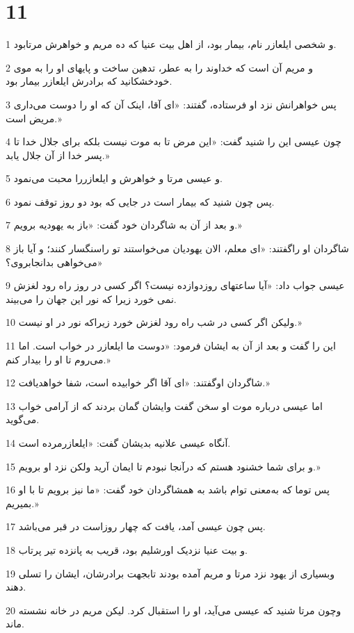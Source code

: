 \chapter{11}

\par 1 و شخصی ایلعازر نام، بیمار بود، از اهل بیت عنیا که ده مریم و خواهرش مرتابود.
\par 2 و مریم آن است که خداوند را به عطر، تدهین ساخت و پایهای او را به موی خودخشکانید که برادرش ایلعازر بیمار بود.
\par 3 پس خواهرانش نزد او فرستاده، گفتند: «ای آقا، اینک آن که او را دوست می‌داری مریض است.»
\par 4 چون عیسی این را شنید گفت: «این مرض تا به موت نیست بلکه برای جلال خدا تا پسر خدا از آن جلال یابد.»
\par 5 و عیسی مرتا و خواهرش و ایلعازررا محبت می‌نمود.
\par 6 پس چون شنید که بیمار است در جایی که بود دو روز توقف نمود.
\par 7 و بعد از آن به شاگردان خود گفت: «باز به یهودیه برویم.»
\par 8 شاگردان او راگفتند: «ای معلم، الان یهودیان می‌خواستند تو راسنگسار کنند؛ و آیا باز می‌خواهی بدانجابروی؟»
\par 9 عیسی جواب داد: «آیا ساعتهای روزدوازده نیست؟ اگر کسی در روز راه رود لغزش نمی خورد زیرا که نور این جهان را می‌بیند.
\par 10 ولیکن اگر کسی در شب راه رود لغزش خورد زیراکه نور در او نیست.»
\par 11 این را گفت و بعد از آن به ایشان فرمود: «دوست ما ایلعازر در خواب است. اما می‌روم تا او را بیدار کنم.»
\par 12 شاگردان اوگفتند: «ای آقا اگر خوابیده است، شفا خواهدیافت.»
\par 13 اما عیسی درباره موت او سخن گفت وایشان گمان بردند که از آرامی خواب می‌گوید.
\par 14 آنگاه عیسی علانیه بدیشان گفت: «ایلعازرمرده است.
\par 15 و برای شما خشنود هستم که درآنجا نبودم تا ایمان آرید ولکن نزد او برویم.»
\par 16 پس توما که به‌معنی توام باشد به همشاگردان خود گفت: «ما نیز برویم تا با او بمیریم.»
\par 17 پس چون عیسی آمد، یافت که چهار روزاست در قبر می‌باشد.
\par 18 و بیت عنیا نزدیک اورشلیم بود، قریب به پانزده تیر پرتاب.
\par 19 وبسیاری از یهود نزد مرتا و مریم آمده بودند تابجهت برادرشان، ایشان را تسلی دهند.
\par 20 وچون مرتا شنید که عیسی می‌آید، او را استقبال کرد. لیکن مریم در خانه نشسته ماند.
